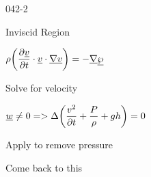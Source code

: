 \begin{mitframe}{042-2}
\begin{listone}
\item Inviscid Region
			\begin{listtwo}
            \item $\dens\bigg(\dfrac{\partial\uline{\vvel}}{\partial{t}}\cdot\uline{\vvel}\cdot\gradop\uline{\vvel}\bigg)=-\gradop\uline{\dynpress}$
            			\begin{listthree}
                        \item Solve for velocity
                        \end{listthree}
            \item $\vort\neq0=>\iipf\bigg(\dfrac{\vvel^2}{\partial{t}}+\dfrac{\p}{\dens}+\grav\heattranscoeff\bigg)=0$
						\begin{listthree}
                        \item Apply to remove pressure
                        
                        \end{listthree}
			\end{listtwo}
Come back to this
\end{listone}   
\end{mitframe}